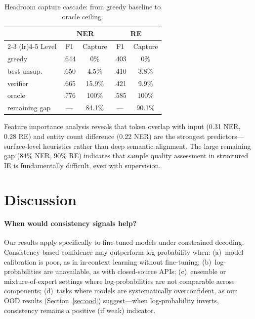 \documentclass[11pt,a4paper]{article}
\begin{document}
\begin{table}[t]
\centering
\small
\caption{Headroom capture cascade: from greedy baseline to oracle ceiling.}
\label{tab:headroom}
\begin{tabular}{lcccc}
\toprule
& \multicolumn{2}{c}{\textbf{NER}} & \multicolumn{2}{c}{\textbf{RE}} \\
\cmidrule(lr){2-3} \cmidrule(lr){4-5}
Level & F1 & Capture & F1 & Capture \\
\midrule
greedy & .644 & 0\% & .403 & 0\% \\
best unsup. & .650 & 4.5\% & .410 & 3.8\% \\
verifier & .665 & 15.9\% & .421 & 9.9\% \\
oracle & .776 & 100\% & .585 & 100\% \\
\midrule
remaining gap & --- & 84.1\% & --- & 90.1\% \\
\bottomrule
\end{tabular}
\end{table}

Feature importance analysis reveals that token overlap with input (0.31 NER, 0.28 RE) and entity count difference (0.22 NER) are the strongest predictors---surface-level heuristics rather than deep semantic alignment. The large remaining gap (84\% NER, 90\% RE) indicates that sample quality assessment in structured IE is fundamentally difficult, even with supervision.

\section{Discussion}

\paragraph{When would consistency signals help?}
Our results apply specifically to fine-tuned models under constrained decoding. Consistency-based confidence may outperform log-probability when: (a)~model calibration is poor, as in in-context learning without fine-tuning; (b)~log-probabilities are unavailable, as with closed-source APIs; (c)~ensemble or mixture-of-expert settings where log-probabilities are not comparable across components; (d)~tasks where models are systematically overconfident, as our OOD results (Section~\ref{sec:ood}) suggest---when log-probability inverts, consistency remains a positive (if weak) indicator.
\end{document}
